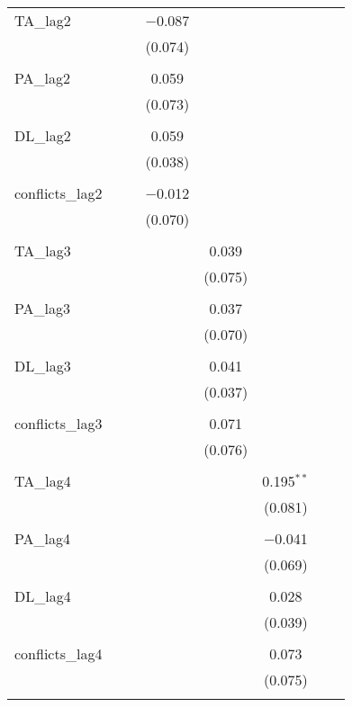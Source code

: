 \begin{table}[!htbp]
\begin{tabular}{@{\extracolsep{5pt}}lccccccc}
 TA\_lag2 &  &  & $-$0.087 &  &  &  &  \\ 
  &  &  & (0.074) &  &  &  &  \\ 
  & & & & & & & \\ 
 PA\_lag2 &  &  & 0.059 &  &  &  &  \\ 
  &  &  & (0.073) &  &  &  &  \\ 
  & & & & & & & \\ 
 DL\_lag2 &  &  & 0.059 &  &  &  &  \\ 
  &  &  & (0.038) &  &  &  &  \\ 
  & & & & & & & \\ 
 conflicts\_lag2 &  &  & $-$0.012 &  &  &  &  \\ 
  &  &  & (0.070) &  &  &  &  \\ 
  & & & & & & & \\ 
 TA\_lag3 &  &  &  & 0.039 &  &  &  \\ 
  &  &  &  & (0.075) &  &  &  \\ 
  & & & & & & & \\ 
 PA\_lag3 &  &  &  & 0.037 &  &  &  \\ 
  &  &  &  & (0.070) &  &  &  \\ 
  & & & & & & & \\ 
 DL\_lag3 &  &  &  & 0.041 &  &  &  \\ 
  &  &  &  & (0.037) &  &  &  \\ 
  & & & & & & & \\ 
 conflicts\_lag3 &  &  &  & 0.071 &  &  &  \\ 
  &  &  &  & (0.076) &  &  &  \\ 
  & & & & & & & \\ 
 TA\_lag4 &  &  &  &  & 0.195$^{**}$ &  &  \\ 
  &  &  &  &  & (0.081) &  &  \\ 
  & & & & & & & \\ 
 PA\_lag4 &  &  &  &  & $-$0.041 &  &  \\ 
  &  &  &  &  & (0.069) &  &  \\ 
  & & & & & & & \\ 
 DL\_lag4 &  &  &  &  & 0.028 &  &  \\ 
  &  &  &  &  & (0.039) &  &  \\ 
  & & & & & & & \\ 
 conflicts\_lag4 &  &  &  &  & 0.073 &  &  \\ 
  &  &  &  &  & (0.075) &  &  \\ 
  & & & & & & & \\ 

\end{tabular}
\end{table}
